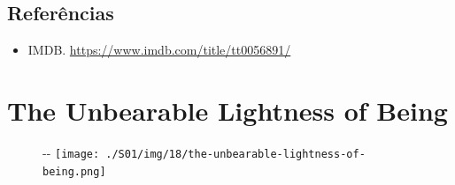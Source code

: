 \hypertarget{referuxeancias-15}{%
\subsection{Referências}\label{referuxeancias-15}}

\begin{itemize}
\tightlist
\item
  \sloppy IMDB. \url{https://www.imdb.com/title/tt0056891/}
\end{itemize}

\hypertarget{the-unbearable-lightness-of-being}{%
\section{The Unbearable Lightness of
Being}\label{the-unbearable-lightness-of-being}}

\begin{figure}[!ht]
  \begin{adjustwidth}{-\oddsidemargin-1in}{-\rightmargin}
    \centering
    \texttt{[image: ./S01/img/18/the-unbearable-lightness-of-being.png]}
  \end{adjustwidth}
\end{figure}

